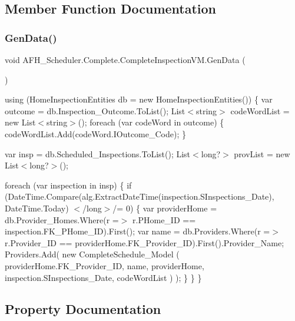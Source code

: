 \subsection{Member Function Documentation}
\mbox{\label{class_a_f_h___scheduler_1_1_complete_1_1_complete_inspection_v_m_aff0a19975352ecba2895c0d5f8a03fa5}} 
\subsubsection{GenData()}
{\footnotesize\ttfamily void A\+F\+H\+\_\+\+Scheduler.\+Complete.\+Complete\+Inspection\+V\+M.\+Gen\+Data (\begin{DoxyParamCaption}{ }\end{DoxyParamCaption})}

using (Home\+Inspection\+Entities db = new Home\+Inspection\+Entities()) \{ var outcome = db.\+Inspection\+\_\+\+Outcome.\+To\+List(); List$<$string$>$ code\+Word\+List = new List$<$string$>$(); foreach (var code\+Word in outcome) \{ code\+Word\+List.\+Add(code\+Word.\+I\+Outcome\+\_\+\+Code); \}

var insp = db.\+Scheduled\+\_\+\+Inspections.\+To\+List(); List$<$long?$>$ prov\+List = new List$<$long?$>$();

foreach (var inspection in insp) \{ if (Date\+Time.\+Compare(alg.\+Extract\+Date\+Time(inspection.\+S\+Inspections\+\_\+\+Date), Date\+Time.\+Today) $<$/long$>$/= 0) \{ var provider\+Home = db.\+Provider\+\_\+\+Homes.\+Where(r =$>$ r.\+P\+Home\+\_\+\+ID == inspection.\+F\+K\+\_\+\+P\+Home\+\_\+\+ID).First(); var name = db.\+Providers.\+Where(r =$>$ r.\+Provider\+\_\+\+ID == provider\+Home.\+F\+K\+\_\+\+Provider\+\_\+\+ID).First().Provider\+\_\+\+Name; Providers.\+Add( new Complete\+Schedule\+\_\+\+Model ( provider\+Home.\+F\+K\+\_\+\+Provider\+\_\+\+ID, name, provider\+Home, inspection.\+S\+Inspections\+\_\+\+Date, code\+Word\+List ) ); \} \} \}

\subsection{Property Documentation}
\mbox{\label{class_a_f_h___scheduler_1_1_complete_1_1_complete_inspection_v_m_af2df0b1c1297a29b0c0dc6c3ed8e194b}} 

